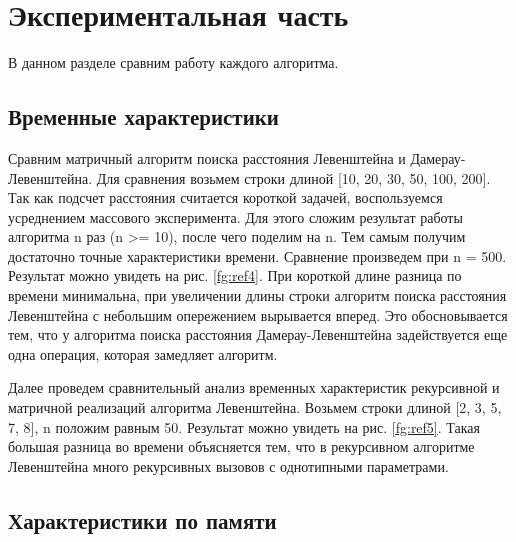 \chapter{Экспериментальная часть}

В данном разделе сравним работу каждого алгоритма.

\section{Временные характеристики}

Сравним матричный алгоритм поиска расстояния Левенштейна и Дамерау-Левенштейна.
Для сравнения возьмем строки длиной [10, 20, 30, 50, 100, 200]. 
Так как подсчет расстояния считается короткой задачей, воспользуемся усреднением массового эксперимента. 
Для этого сложим результат работы алгоритма n раз (n >= 10), после чего поделим на n. 
Тем самым получим достаточно точные характеристики времени. 
Сравнение произведем при n = 500.
Результат можно увидеть на рис. \ref{fg:ref4}. При короткой длине разница по времени минимальна, при увеличении длины строки алгоритм поиска расстояния Левенштейна с небольшим опережением вырывается вперед. Это обосновывается тем, что у алгоритма поиска расстояния Дамерау-Левенштейна задействуется еще одна операция, которая замедляет алгоритм.

\begin{figure}[ht!]
\end{figure}

Далее проведем сравнительный анализ временных характеристик рекурсивной и матричной реализаций алгоритма Левенштейна. 
Возьмем строки длиной [2, 3, 5, 7, 8], n положим равным 50.
Результат можно увидеть на рис. \ref{fg:ref5}.
Такая большая разница во времени объясняется тем, что в рекурсивном алгоритме Левенштейна много рекурсивных вызовов с однотипными параметрами.

\begin{figure}[ht!]
\end{figure}

\section{Характеристики по памяти}


